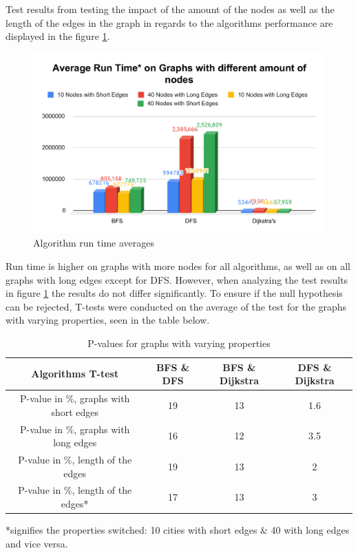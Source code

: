 \documentclass{csfourzero}
\begin{document}
Test results from testing the impact of the amount of the nodes as well as the length of the edges in the graph in regards to the algorithms performance are displayed in the figure \ref{fig:avgdifnode}.
\begin{figure}[h]
\includegraphics [scale = 0.7]{images/AVG_RUNTIME_DIF_NODES.pdf}
\caption{Algorithm run time averages }
\label{fig:avgdifnode}
\end{figure}

Run time is higher on graphs with more nodes for all algorithms, as well as on all graphs with long edges except for DFS. However, when analyzing the test results in figure \ref{fig:avgdifnode} the results do not differ significantly. To ensure if the null hypothesis can be rejected, T-tests were conducted on the average of the test for the graphs with varying properties, seen in the table below. 
\begin{table}[h]
\centering
\caption{P-values for graphs with varying properties}
\begin{tabular}{ |c|c|c|c| }  
 \hline 
 Algorithms T-test & BFS \& DFS & BFS \& Dijkstra & DFS \& Dijkstra\\ 
 \hline
P-value in \%, graphs with short edges & 19 & 13 & 1.6 \\ 
  \hline
P-value in \%, graphs with long edges & 16 & 12 & 3.5\\ 
  \hline
P-value in \%, length of the edges & 19 & 13 & 2\\ 
    \hline
P-value in \%, length of the edges* & 17 & 13 & 3\\ 
  \hline
\end{tabular}
\label{tab:pvaluevar}
\end{table}

*signifies the properties switched: 10 cities with short edges \& 40 with long edges and vice versa. 
\end{document}
